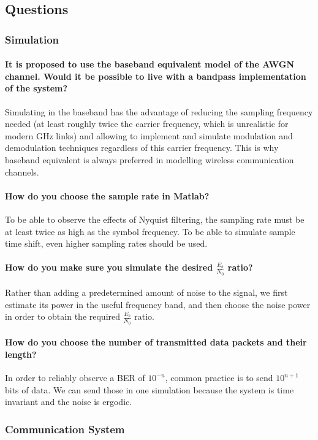 \subsection{Questions}
\subsubsection{Simulation}
\paragraph{It is proposed to use the baseband equivalent model of the AWGN channel. Would it be
possible to live with a bandpass implementation of the system?}
Simulating in the baseband has the advantage of reducing the sampling frequency needed (at least roughly twice the carrier frequency, which is unrealistic for modern \si{\giga\hertz} links) and allowing to implement and simulate modulation and demodulation techniques regardless of this carrier frequency.
This is why baseband equivalent is always preferred in modelling wireless communication channels.
\paragraph{How do you choose the sample rate in Matlab?}
To be able to observe the effects of Nyquist filtering, the sampling rate must be at least twice as high as the symbol frequency. To be able to simulate sample time shift, even higher sampling rates should be used.
\paragraph{How do you make sure you simulate the desired $\frac{E_b}{N_0}$ ratio?}
Rather than adding a predetermined amount of noise to the signal, we first estimate its power in the useful frequency band, and then choose the noise power in order to obtain the required $\frac{E_b}{N_0}$ ratio.
\paragraph{How do you choose the number of transmitted data packets and their length?}
In order to reliably observe a BER of $10^{-n}$, common practice is to send $10^{n+1}$ bits of data. We can send those in one simulation because the system is time invariant and the noise is ergodic.
\subsubsection{Communication System}
